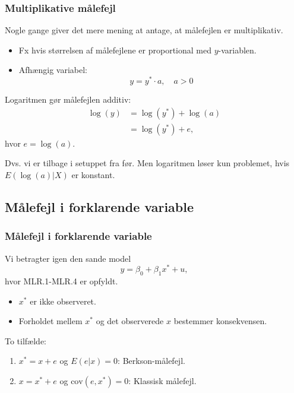 \documentclass[aspectratio=43,t]{beamer}
\begin{document}
\begin{frame}
\frametitle{Multiplikative målefejl}

	 Nogle gange giver det mere mening at antage, at målefejlen er multiplikativ.
	\begin{itemize}
	\item Fx hvis størrelsen af målefejlene er proportional med $y$-variablen.

	\item Afhængig variabel:
	\begin{equation*}
	y=y^{*}\cdot a, \quad a>0
	\end{equation*}
	\end{itemize}	
	Logaritmen gør målefejlen additiv:
	\begin{align*}
	\log (y) &= \log (y^{*}) + \log(a) \\ 
		      &= \log (y^{*}) + e,  
	\end{align*}
	hvor $e = \log (a)$.

	Dvs. vi er tilbage i setuppet fra før. Men logaritmen løser kun problemet, hvis $E(\log(a)|X)$ er konstant.

	
\end{frame}



\subsection{Målefejl i forklarende variable}


\begin{frame}
\frametitle{Målefejl i forklarende variable}

	Vi betragter igen den sande model
	\begin{equation*}
	y=\beta_{0}+\beta_{1}x^{*}+u,
	\end{equation*}
	hvor MLR.1-MLR.4 er opfyldt.
	\begin{itemize}
	\item $x^{*}$ er ikke observeret.
	\item Forholdet mellem $x^*$ og det observerede $x$ bestemmer konsekvensen.
	\end{itemize}
	
	To tilfælde:
	\begin{enumerate}
	\item $x^*=x+e$ og $E(e|x)=0$: Berkson-målefejl.
	
	\item $x=x^*+e$ og $\text{cov}(e,x^{*})=0$: Klassisk målefejl.
	\end{enumerate}

\end{frame}
\end{document}
